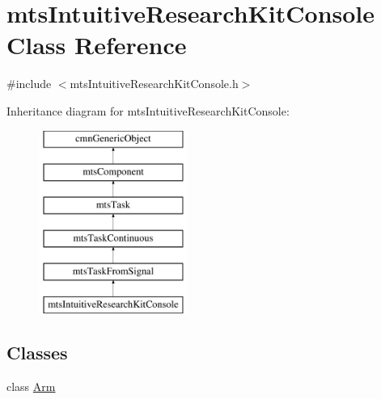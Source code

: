 \hypertarget{classmts_intuitive_research_kit_console}{}\section{mts\+Intuitive\+Research\+Kit\+Console Class Reference}
\label{classmts_intuitive_research_kit_console}


{\ttfamily \#include $<$mts\+Intuitive\+Research\+Kit\+Console.\+h$>$}

Inheritance diagram for mts\+Intuitive\+Research\+Kit\+Console\+:\begin{figure}[H]
\begin{center}
\leavevmode
\includegraphics[height=6.000000cm]{dc/de3/classmts_intuitive_research_kit_console}
\end{center}
\end{figure}
\subsection*{Classes}
\begin{DoxyCompactItemize}
\item 
class \hyperlink{classmts_intuitive_research_kit_console_1_1_arm}{Arm}
\end{DoxyCompactItemize}
